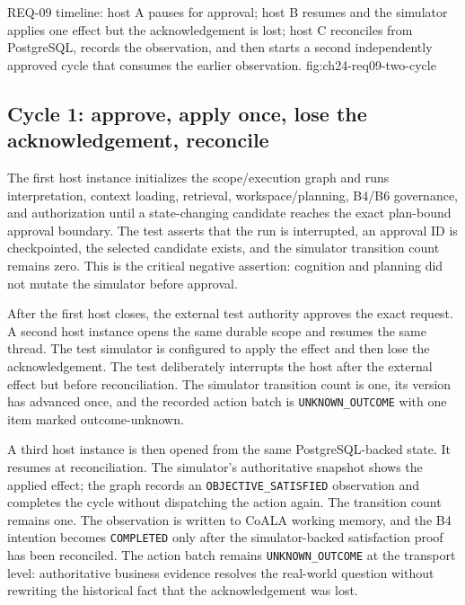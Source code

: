  {REQ-09 timeline: host A pauses for approval; host B resumes and the simulator applies one effect but the acknowledgement is lost; host C reconciles from PostgreSQL, records the observation, and then starts a second independently approved cycle that consumes the earlier observation.}
  {fig:ch24-req09-two-cycle}

\subsection{Cycle 1: approve, apply once, lose the acknowledgement, reconcile}

The first host instance initializes the scope/execution graph and runs interpretation, context loading, retrieval, workspace/planning, B4/B6 governance, and authorization until a state-changing candidate reaches the exact plan-bound approval boundary. The test asserts that the run is interrupted, an approval ID is checkpointed, the selected candidate exists, and the simulator transition count remains zero. This is the critical negative assertion: cognition and planning did not mutate the simulator before approval.

After the first host closes, the external test authority approves the exact request. A second host instance opens the same durable scope and resumes the same thread. The test simulator is configured to apply the effect and then lose the acknowledgement. The test deliberately interrupts the host after the external effect but before reconciliation. The simulator transition count is one, its version has advanced once, and the recorded action batch is \texttt{UNKNOWN\_OUTCOME} with one item marked outcome-unknown.

A third host instance is then opened from the same PostgreSQL-backed state. It resumes at reconciliation. The simulator's authoritative snapshot shows the applied effect; the graph records an \texttt{OBJECTIVE\_SATISFIED} observation and completes the cycle without dispatching the action again. The transition count remains one. The observation is written to CoALA working memory, and the B4 intention becomes \texttt{COMPLETED} only after the simulator-backed satisfaction proof has been reconciled. The action batch remains \texttt{UNKNOWN\_OUTCOME} at the transport level: authoritative business evidence resolves the real-world question without rewriting the historical fact that the acknowledgement was lost.

